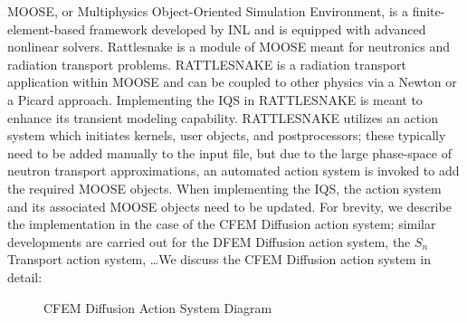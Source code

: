\documentclass[12pt]{article}
\begin{document}
MOOSE, or Multiphysics Object-Oriented Simulation Environment, is a finite-element-based  framework developed by INL and is equipped with advanced nonlinear solvers.  Rattlesnake is a module of MOOSE meant for neutronics and radiation transport problems.  RATTLESNAKE is a radiation transport application within MOOSE and can be coupled to other physics via a Newton or a Picard approach. Implementing the IQS in RATTLESNAKE is meant to enhance its transient modeling capability.  RATTLESNAKE utilizes an action system which initiates kernels, user objects, and postprocessors; these typically need to be added manually to the input file, but due to the large phase-space of neutron transport approximations, an automated action system is invoked to add the required MOOSE objects. When implementing the IQS, the action system and its associated MOOSE objects need to be updated. For brevity, we describe the implementation in the case of the CFEM Diffusion action system; similar developments are carried out for the DFEM Diffusion action system, the $S_n$ Transport action system, \ldots We discuss the CFEM Diffusion action system in detail: 

\begin{figure}[h]
\caption{CFEM Diffusion Action System Diagram}   
\label{Action}
\end{figure} 
\end{document}
